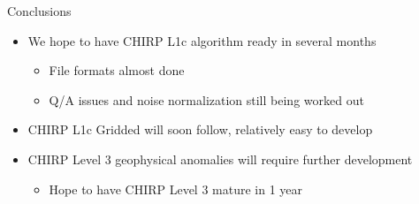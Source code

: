 \documentclass[10pt,t]{beamer}
\begin{document}
\begin{frame}[label={sec:org3a0c2c9}]{Conclusions}
\begin{itemize}
\item We hope to have CHIRP L1c algorithm ready in several months
\begin{itemize}
\item File formats almost done
\item Q/A issues and noise normalization still being worked out
\end{itemize}
\item CHIRP L1c Gridded will soon follow, relatively easy to develop
\item CHIRP Level 3 geophysical anomalies will require further development
\begin{itemize}
\item Hope to have CHIRP Level 3 mature in 1 year
\end{itemize}
\end{itemize}
\end{frame}
\end{document}
